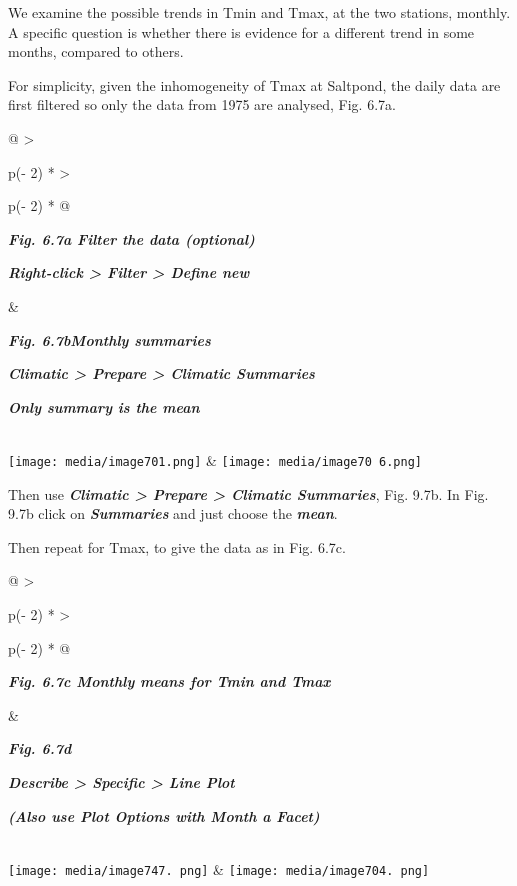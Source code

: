 \documentclass[
  letterpaper,
  DIV=11,
  numbers=noendperiod]{scrreprt}
\begin{document}
We examine the possible trends in Tmin and Tmax, at the two stations,
monthly. A specific question is whether there is evidence for a
different trend in some months, compared to others.

For simplicity, given the inhomogeneity of Tmax at Saltpond, the daily
data are first filtered so only the data from 1975 are analysed, Fig.
6.7a.

\begin{longtable}[]{@{}
  >{\raggedright\arraybackslash}p{(\columnwidth - 2\tabcolsep) * }
  >{\raggedright\arraybackslash}p{(\columnwidth - 2\tabcolsep) * }@{}}
\toprule\noalign{}
\begin{minipage}[b]{\linewidth}\raggedright
\textbf{\emph{Fig. 6.7a Filter the data (optional)}}

\textbf{\emph{Right-click \textgreater{} Filter \textgreater{} Define
new}}
\end{minipage} & \begin{minipage}[b]{\linewidth}\raggedright
\textbf{\emph{Fig. 6.7bMonthly summaries}}

\textbf{\emph{Climatic \textgreater{} Prepare \textgreater{} Climatic
Summaries}}

\textbf{\emph{Only summary is the mean}}
\end{minipage} \\
\midrule\noalign{}
\endhead
\bottomrule\noalign{}
\endlastfoot
\texttt{[image: media/image701.png]} &
\texttt{[image: media/image70 6.png]} \\
\end{longtable}

Then use \textbf{\emph{Climatic \textgreater{} Prepare \textgreater{}
Climatic Summaries}}, Fig. 9.7b. In Fig. 9.7b click on
\textbf{\emph{Summaries}} and just choose the \textbf{\emph{mean}}.

Then repeat for Tmax, to give the data as in Fig. 6.7c.

\begin{longtable}[]{@{}
  >{\raggedright\arraybackslash}p{(\columnwidth - 2\tabcolsep) * }
  >{\raggedright\arraybackslash}p{(\columnwidth - 2\tabcolsep) * }@{}}
\toprule\noalign{}
\begin{minipage}[b]{\linewidth}\raggedright
\textbf{\emph{Fig. 6.7c Monthly means for Tmin and Tmax}}
\end{minipage} & \begin{minipage}[b]{\linewidth}\raggedright
\textbf{\emph{Fig. 6.7d}}

\textbf{\emph{Describe \textgreater{} Specific \textgreater{} Line
Plot}}

\textbf{\emph{(Also use Plot Options with Month a Facet)}}
\end{minipage} \\
\midrule\noalign{}
\endhead
\bottomrule\noalign{}
\endlastfoot
\texttt{[image: media/image747. png]} &
\texttt{[image: media/image704. png]} \\
\end{longtable}
\end{document}
